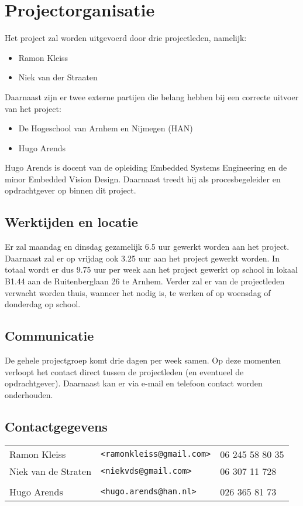 \chapter{Projectorganisatie}

Het project zal worden uitgevoerd door drie projectleden, namelijk:

\begin{itemize}
    \item Ramon Kleiss
    \item Niek van der Straaten
\end{itemize}

Daarnaast zijn er twee externe partijen die belang hebben bij een correcte
uitvoer van het project:

\begin{itemize}
    \item De Hogeschool van Arnhem en Nijmegen (HAN)
    \item Hugo Arends
\end{itemize}

Hugo Arends is docent van de opleiding Embedded Systems Engineering en de minor
Embedded Vision Design. Daarnaast treedt hij als procesbegeleider en
opdrachtgever op binnen dit project.

\section{Werktijden en locatie}

Er zal maandag en dinsdag gezamelijk 6.5 uur gewerkt worden aan het project.
Daarnaast zal er op vrijdag ook 3.25 uur aan het project gewerkt worden. In
totaal wordt er dus 9.75 uur per week aan het project gewerkt op school in
lokaal B1.44 aan de Ruitenberglaan 26 te Arnhem. Verder
zal er van de projectleden verwacht worden thuis, wanneer het nodig is, te
werken of op woensdag of donderdag op school.

\section{Communicatie}

De gehele projectgroep komt drie dagen per week samen. Op deze momenten
verloopt het contact direct tussen de projectleden (en eventueel de
opdrachtgever). Daarnaast kan er via e-mail en telefoon contact worden
onderhouden.

\section{Contactgegevens}

\begin{tabular}{l l l}
    Ramon Kleiss & \texttt{<ramonkleiss@gmail.com>} & 06 245 58 80 35 \\
    Niek van de Straten & \texttt{<niekvds@gmail.com>} & 06 307 11 728 \\
    \\
    Hugo Arends & \texttt{<hugo.arends@han.nl>} & 026 365 81 73 \\
\end{tabular}

